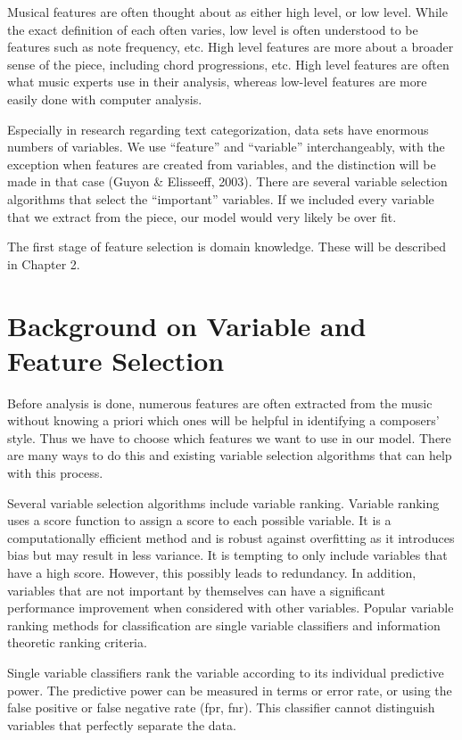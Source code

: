 \documentclass[12pt,twoside]{reedthesis}
\theoremstyle{definition}
\theoremstyle{definition}
\theoremstyle{definition}
\theoremstyle{remark}
\begin{document}
Musical features are often thought about as either high level, or low
level. While the exact definition of each often varies, low level is
often understood to be features such as note frequency, etc. High level
features are more about a broader sense of the piece, including chord
progressions, etc. High level features are often what music experts use
in their analysis, whereas low-level features are more easily done with
computer analysis.

Especially in research regarding text categorization, data sets have
enormous numbers of variables. We use ``feature'' and ``variable''
interchangeably, with the exception when features are created from
variables, and the distinction will be made in that case (Guyon \&
Elisseeff, 2003). There are several variable selection algorithms that
select the ``important'' variables. If we included every variable that
we extract from the piece, our model would very likely be over fit.

The first stage of feature selection is domain knowledge. These will be
described in Chapter 2.

\section{Background on Variable and Feature
Selection}\label{background-on-variable-and-feature-selection}

Before analysis is done, numerous features are often extracted from the
music without knowing a priori which ones will be helpful in identifying
a composers' style. Thus we have to choose which features we want to use
in our model. There are many ways to do this and existing variable
selection algorithms that can help with this process.

Several variable selection algorithms include variable ranking. Variable
ranking uses a score function to assign a score to each possible
variable. It is a computationally efficient method and is robust against
overfitting as it introduces bias but may result in less variance. It is
tempting to only include variables that have a high score. However, this
possibly leads to redundancy. In addition, variables that are not
important by themselves can have a significant performance improvement
when considered with other variables. Popular variable ranking methods
for classification are single variable classifiers and information
theoretic ranking criteria.

Single variable classifiers rank the variable according to its
individual predictive power. The predictive power can be measured in
terms or error rate, or using the false positive or false negative rate
(fpr, fnr). This classifier cannot distinguish variables that perfectly
separate the data.
\end{document}
